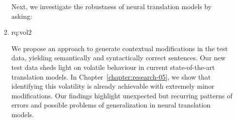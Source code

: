 \begin{enumerate}[label=\textbf{Research Question \arabic*:},ref={RQ\arabic*},wide = 0pt,resume]
\begin{enumerate}[label=\textbf{RQ3.\arabic*},wide = 0pt, leftmargin=2em]
Next, we investigate the robustness of neural translation models by asking:

\item \acl{rq:vol2} \label{rq:vol2}

\medskip

We propose an approach to generate contextual modifications in the test data, yielding semantically and syntactically correct sentences.
Our new test data sheds light on volatile behaviour in current state-of-the-art translation models. 
In Chapter~\ref{chapter:research-05}, we show that identifying this volatility is already achievable with extremely minor modifications.
Our findings highlight unexpected but recurring patterns of errors and possible problems of generalization in neural translation models.

\end{enumerate}
\end{enumerate}

